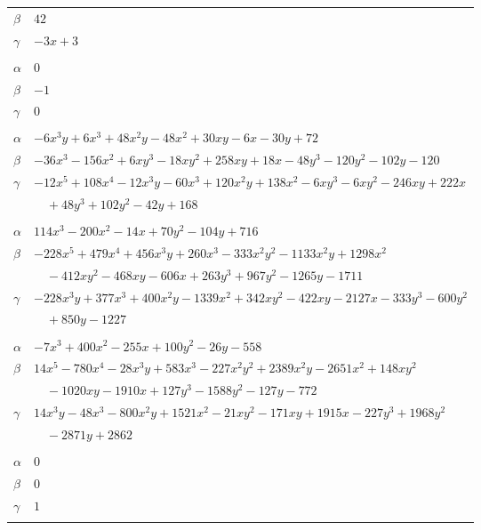 \documentclass[11pt]{article}
\begin{document}
\begin{longtable}{@{}ll@{}}
$\beta$ & $42$\\
$\gamma$ & $-3x+3$\\
\addlinespace[3pt]
\multicolumn{2}{@{}l}{$\{i,j\}=\{112,218\}$, $k_{ij}=2$}\\
$\alpha$ & $0$\\
$\beta$ & $-1$\\
$\gamma$ & $0$\\
\addlinespace[3pt]
\multicolumn{2}{@{}l}{$\{i,j\}=\{118,119\}$, $k_{ij}=2^{5}\cdot 3$}\\
$\alpha$ & $-6x^{3}y+6x^{3}+48x^{2}y-48x^{2}+30xy-6x-30y+72$\\
$\beta$ & $-36x^{3}-156x^{2}+6xy^{3}-18xy^{2}+258xy+18x-48y^{3}-120y^{2}-102y-120$\\
$\gamma$ & $-12x^{5}+108x^{4}-12x^{3}y-60x^{3}+120x^{2}y+138x^{2}-6xy^{3}-6xy^{2}-246xy+222x$\\
 & $\quad +48y^{3}+102y^{2}-42y+168$\\
\addlinespace[3pt]
\multicolumn{2}{@{}l}{$\{i,j\}=\{118,121\}$, $k_{ij}=2^{7}\cdot 13$}\\
$\alpha$ & $114x^{3}-200x^{2}-14x+70y^{2}-104y+716$\\
$\beta$ & $-228x^{5}+479x^{4}+456x^{3}y+260x^{3}-333x^{2}y^{2}-1133x^{2}y+1298x^{2}$\\
 & $\quad -412xy^{2}-468xy-606x+263y^{3}+967y^{2}-1265y-1711$\\
$\gamma$ & $-228x^{3}y+377x^{3}+400x^{2}y-1339x^{2}+342xy^{2}-422xy-2127x-333y^{3}-600y^{2}$\\
 & $\quad +850y-1227$\\
\addlinespace[3pt]
\multicolumn{2}{@{}l}{$\{i,j\}=\{118,122\}$, $k_{ij}=2^{5}\cdot 13$}\\
$\alpha$ & $-7x^{3}+400x^{2}-255x+100y^{2}-26y-558$\\
$\beta$ & $14x^{5}-780x^{4}-28x^{3}y+583x^{3}-227x^{2}y^{2}+2389x^{2}y-2651x^{2}+148xy^{2}$\\
 & $\quad -1020xy-1910x+127y^{3}-1588y^{2}-127y-772$\\
$\gamma$ & $14x^{3}y-48x^{3}-800x^{2}y+1521x^{2}-21xy^{2}-171xy+1915x-227y^{3}+1968y^{2}$\\
 & $\quad -2871y+2862$\\
\addlinespace[3pt]
\multicolumn{2}{@{}l}{$\{i,j\}=\{118,176\}$, $k_{ij}=2$}\\
$\alpha$ & $0$\\
$\beta$ & $0$\\
$\gamma$ & $1$\\
\addlinespace[3pt]
\multicolumn{2}{@{}l}{$\{i,j\}=\{119,120\}$, $k_{ij}=2^{5}\cdot 3^{2}\cdot 5$}\\

\end{longtable}
\end{document}
